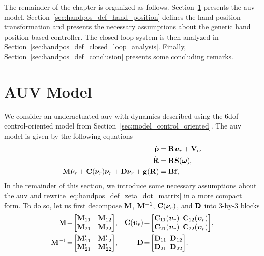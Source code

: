 The remainder of the chapter is organized as follows.
Section~\ref{sec:handpos_def_model} presents the \gls{auv} model.
Section~\ref{sec:handpos_def_hand_position} defines the hand position transformation and presents the necessary assumptions about the generic hand position-based controller.
The closed-loop system is then analyzed in Section~\ref{sec:handpos_def_closed_loop_analysis}.
Finally, Section~\ref{sec:handpos_def_conclusion} presents some concluding remarks.

\section{AUV Model}
\label{sec:handpos_def_model}

We consider an underactuated \gls{auv} with dynamics described using the 6\gls{dof} control-oriented model from Section~\ref{sec:model_control_oriented}.
The \gls{auv} model is given by the following equations
\begin{subequations}
    \begin{align}
        \dot{\mathbf{p}} &= \mathbf{R}\bm{\upsilon}_r + \mathbf{V}_c, \\
        \dot{\mathbf{R}} &= \mathbf{R}\mathbf{S}(\bm{\omega}), \\
        \mathbf{M}\dot{\bm{\nu}}_r + \mathbf{C}(\bm{\nu}_r)\bm{\nu}_r + \mathbf{D}\bm{\nu}_r + \mathbf{g}(\mathbf{R}) &= \mathbf{B}\mathbf{f}, \label{eq:handpos_def_zeta_dot_matrix}
    \end{align}
\end{subequations}
In the remainder of this section, we introduce some necessary assumptions about the \gls{auv} and rewrite \eqref{eq:handpos_def_zeta_dot_matrix} in a more compact form.
To do so, let us first decompose $\mathbf{M}$, $\mathbf{M}^{-1}$, $\mathbf{C}(\bm{\nu}_r)$, and $\mathbf{D}$ into 3-by-3 blocks
\begin{subequations}
\begin{align}
    \mat{M}\! &=\! \begin{bmatrix}
        \mat{M}_{11} & \mat{M}_{12} \\ \mat{M}_{21} & \mat{M}_{22}
    \end{bmatrix}\!, &
    \mat{C}(\bvel_r)\! &=\! \begin{bmatrix}
        \mat{C}_{11}(\bvel_r)\!\!\! & \mat{C}_{12}(\bvel_r) \\ \mat{C}_{21}(\bvel_r)\!\!\! & \mat{C}_{22}(\bvel_r)
    \end{bmatrix}\!, \\
    \mat{M}^{-1}\! &=\! \begin{bmatrix}
        \mat{M}_{11}^{\prime} & \mat{M}_{12}^{\prime} \\ \mat{M}_{21}^{\prime} & \mat{M}_{22}^{\prime}
    \end{bmatrix}\!, &
    \mat{D}\! &=\! \begin{bmatrix}
        \mat{D}_{11}\!\!\! & \mat{D}_{12} \\ \mat{D}_{21}\!\!\! & \mat{D}_{22}
    \end{bmatrix}\!.
\end{align}
\end{subequations}

